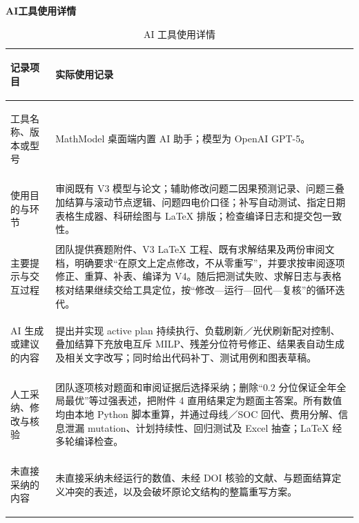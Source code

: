 \documentclass[12pt,a4paper]{ctexart}
\begin{document}
\begin{center}
	{\bfseries AI工具使用详情}
\end{center}

\begin{table}[htbp]
	\centering
	\caption{AI 工具使用详情}
	\begin{tabularx}{\textwidth}{>{\bfseries\raggedright\arraybackslash}p{3.6cm}X}
		\toprule
		记录项目 & 实际使用记录 \\
		\midrule
		工具名称、版本或型号 & MathModel 桌面端内置 AI 助手；模型为 OpenAI GPT-5。 \\
		使用目的与环节 & 审阅既有 V3 模型与论文；辅助修改问题二因果预测记录、问题三叠加结算与滚动节点逻辑、问题四电价口径；补写自动测试、指定日期表格生成器、科研绘图与 LaTeX 排版；检查编译日志和提交包一致性。 \\
		主要提示与交互过程 & 团队提供赛题附件、V3 LaTeX 工程、既有求解结果及两份审阅文档，明确要求“在原文上定点修改，不从零重写”，并要求按审阅逐项修正、重算、补表、编译为 V4。随后把测试失败、求解日志与表格核对结果继续交给工具定位，按“修改—运行—回代—复核”的循环迭代。 \\
		AI 生成或建议的内容 & 提出并实现 active plan 持续执行、负载刷新／光伏刷新配对控制、叠加结算下充放电互斥 MILP、残差分位符号修正、结果表自动生成及相关文字改写；同时给出代码补丁、测试用例和图表草稿。 \\
		人工采纳、修改与核验 & 团队逐项核对题面和审阅证据后选择采纳；删除“$0.2$ 分位保证全年全局最优”等过强表述，把附件 4 直用结果定为题面主答案。所有数值均由本地 Python 脚本重算，并通过母线／SOC 回代、费用分解、信息泄漏 mutation、计划持续性、回归测试及 Excel 抽查；LaTeX 经多轮编译检查。 \\
		未直接采纳的内容 & 未直接采纳未经运行的数值、未经 DOI 核验的文献、与题面结算定义冲突的表述，以及会破坏原论文结构的整篇重写方案。 \\
		\bottomrule
	\end{tabularx}
\end{table}
\end{document}
